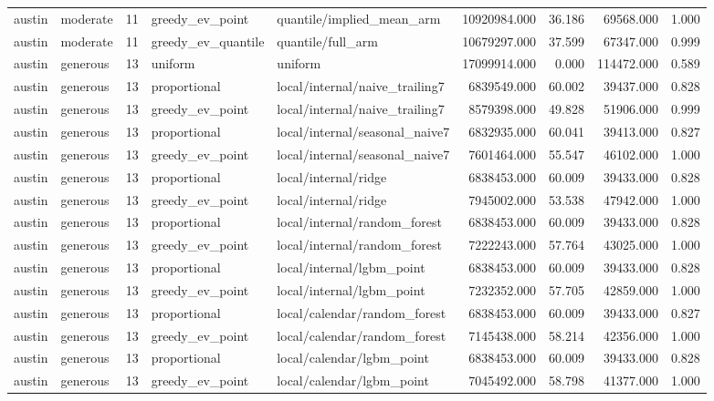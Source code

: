 \begin{tabular}{llrllrrrr}
austin & moderate & 11 & greedy\_ev\_point & quantile/implied\_mean\_arm & 10920984.000 & 36.186 & 69568.000 & 1.000 \\
austin & moderate & 11 & greedy\_ev\_quantile & quantile/full\_arm & 10679297.000 & 37.599 & 67347.000 & 0.999 \\
austin & generous & 13 & uniform & uniform & 17099914.000 & 0.000 & 114472.000 & 0.589 \\
austin & generous & 13 & proportional & local/internal/naive\_trailing7 & 6839549.000 & 60.002 & 39437.000 & 0.828 \\
austin & generous & 13 & greedy\_ev\_point & local/internal/naive\_trailing7 & 8579398.000 & 49.828 & 51906.000 & 0.999 \\
austin & generous & 13 & proportional & local/internal/seasonal\_naive7 & 6832935.000 & 60.041 & 39413.000 & 0.827 \\
austin & generous & 13 & greedy\_ev\_point & local/internal/seasonal\_naive7 & 7601464.000 & 55.547 & 46102.000 & 1.000 \\
austin & generous & 13 & proportional & local/internal/ridge & 6838453.000 & 60.009 & 39433.000 & 0.828 \\
austin & generous & 13 & greedy\_ev\_point & local/internal/ridge & 7945002.000 & 53.538 & 47942.000 & 1.000 \\
austin & generous & 13 & proportional & local/internal/random\_forest & 6838453.000 & 60.009 & 39433.000 & 0.828 \\
austin & generous & 13 & greedy\_ev\_point & local/internal/random\_forest & 7222243.000 & 57.764 & 43025.000 & 1.000 \\
austin & generous & 13 & proportional & local/internal/lgbm\_point & 6838453.000 & 60.009 & 39433.000 & 0.828 \\
austin & generous & 13 & greedy\_ev\_point & local/internal/lgbm\_point & 7232352.000 & 57.705 & 42859.000 & 1.000 \\
austin & generous & 13 & proportional & local/calendar/random\_forest & 6838453.000 & 60.009 & 39433.000 & 0.827 \\
austin & generous & 13 & greedy\_ev\_point & local/calendar/random\_forest & 7145438.000 & 58.214 & 42356.000 & 1.000 \\
austin & generous & 13 & proportional & local/calendar/lgbm\_point & 6838453.000 & 60.009 & 39433.000 & 0.828 \\
austin & generous & 13 & greedy\_ev\_point & local/calendar/lgbm\_point & 7045492.000 & 58.798 & 41377.000 & 1.000 \\

\end{tabular}
